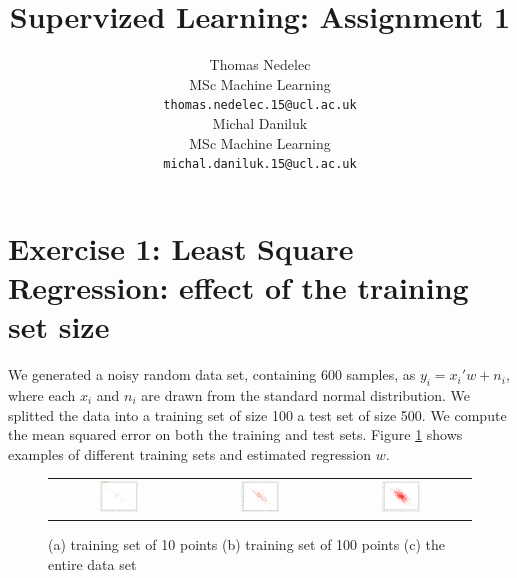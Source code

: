 \documentclass{article} %
\author{
Thomas Nedelec \\
MSc Machine Learning\\
\texttt{thomas.nedelec.15@ucl.ac.uk} \\
\And
Michal Daniluk \\
MSc Machine Learning\\
\texttt{michal.daniluk.15@ucl.ac.uk} \\
}
\title{Supervized Learning: Assignment 1}
\begin{document}
\maketitle

\section{Exercise 1: Least Square Regression: effect of the training set size}
We generated a noisy random data set, containing 600 samples, as $y_i = x_i'w + n_i$, where each $x_i$ and $n_i$ are drawn from the standard normal distribution. We splitted the data into a training set of size 100 a test set of size 500. We compute the mean squared error on both the training and test sets. Figure \ref{fig:lsr} shows examples of different training sets and estimated regression $w$.

 \begin{figure}[h]
\center
\begin{tabular}{ccc}
\includegraphics[width=0.3\textwidth]{10points}&\includegraphics[width=0.3\textwidth]{100points}&\includegraphics[width=0.3\textwidth]{500points}
\end{tabular}
\caption{ (a) training set of 10 points (b) training set of 100 points (c) the entire data set}
\label {fig:lsr}
\end{figure} 
\end{document}
